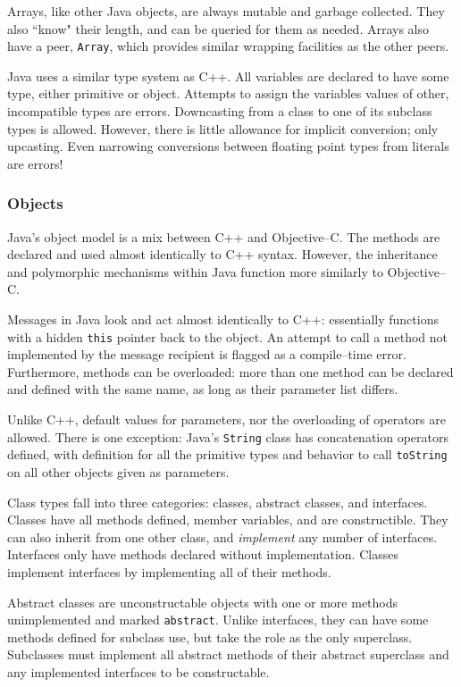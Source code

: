   Arrays, like other Java objects, are always mutable and garbage collected.  They also ``know" their length, and can be queried for them as needed.  Arrays also have a peer, \texttt{Array}, which provides similar wrapping facilities as the other peers.

  Java uses a similar type system as C++.  All variables are declared to have some type, either primitive or object.  Attempts to assign the variables values of other, incompatible types are errors.  Downcasting from a class to one of its subclass types is allowed.  However, there is little allowance for implicit conversion; only upcasting.  Even narrowing conversions between floating point types from literals are errors!

\subsubsection{Objects}
  Java's object model is a mix between C++ and Objective--C.  The methods are declared and used almost identically to C++ syntax.  However, the inheritance and polymorphic mechanisms within Java function more similarly to Objective--C.  

  Messages in Java look and act almost identically to C++: essentially functions with a hidden \texttt{this} pointer back to the object.  An attempt to call a method not implemented by the message recipient is flagged as a compile--time error.  Furthermore, methods can be overloaded: more than one method can be declared and defined with the same name, as long as their parameter list differs.  

  Unlike C++, default values for parameters, nor the overloading of operators are allowed.  There is one exception: Java's \texttt{String} class has concatenation operators defined, with definition for all the primitive types and behavior to call \texttt{toString} on all other objects given as parameters.

  Class types fall into three categories: classes, abstract classes, and interfaces.  Classes have all methods defined, member variables, and are constructible.  They can also inherit from one other class, and \emph{implement} any number of interfaces.  Interfaces only have methods declared without implementation.  Classes implement interfaces by implementing all of their methods.  

  Abstract classes are unconstructable objects with one or more methods unimplemented and marked \texttt{abstract}.  Unlike interfaces, they can have some methods defined for subclass use, but take the role as the only superclass.  Subclasses must implement all abstract methods of their abstract superclass and any implemented interfaces to be constructable.

